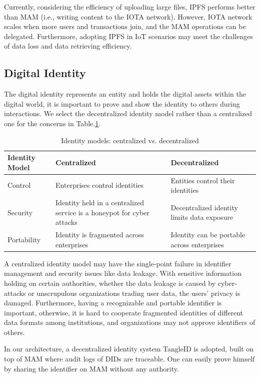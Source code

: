 \documentclass[10pt, conference, compsocconf]{IEEEtran}
\begin{document}
Currently, considering the efficiency of uploading large files, IPFS performs better than MAM (i.e., writing content to the IOTA network). However, IOTA network scales when more users and transactions join, and the MAM operations can be delegated. Furthermore, adopting IPFS in IoT scenarios may meet the challenges of data loss and data retrieving efficiency.

\subsection{Digital Identity}
The digital identity represents an entity and holds the digital assets within the digital world, it is important to prove and show the identity to others during interactions. We select the decentralized identity model rather than a centralized one for the concerns in Table.\ref{tab:did}.
\begin{table}[h]
    \caption{Identity models: centralized vs. decentralized}
    \label{tab:did}
    \begin{tabularx}{\linewidth}{|l|X|X|}
    \hline
        \textbf{Identity Model} & \textbf{Centralized} & \textbf{Decentralized} \\
        \hline
        Control & Enterprises control identities & Entities control their identities \\
        \hline
        Security & Identity held in a centralized service is a honeypot for cyber attacks & Decentralized identity limits data exposure \\
        \hline
        Portability & Identity is fragmented across enterprises & Identity can be portable across enterprises \\
        \hline
    \end{tabularx}
\end{table}

A centralized identity model may have the single-point failure in identifier management and security issues like data leakage. With sensitive information holding on certain authorities, whether the data leakage is caused by cyber-attacks or unscrupulous organizations trading user data, the users' privacy is damaged. Furthermore, having a recognizable and portable identifier is important, otherwise, it is hard to cooperate fragmented identities of different data formats among institutions, and organizations may not approve identifiers of others.

In our architecture, a decentralized identity system TangleID\cite{TangleID} is adopted, built on top of MAM where audit logs of DIDs are traceable. One can easily prove himself by sharing the identifier on MAM without any authority.
\end{document}
